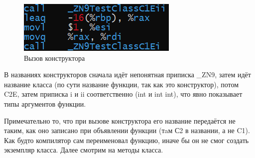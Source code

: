 \documentclass[a4paper,12pt]{article}
\begin{document}
\begin{figure}[H]\label{fig: Названия конструкторов}
\end{figure}
\begin{figure}[H]\label{fig: Вызов конструкторов листинг}
    \centering
    \includegraphics{Вызов конструкторов листинг.png}
    \caption{Вызов конструктора}
\end{figure}

В названиях конструкторов сначала идёт непонятная приписка \_ZN9, затем идёт название класса (по сути название функции, так как это конструктор), потом C2E, затем приписка i и ii соответственно (int и int int), что явно показывает типы аргументов функции.

Примечательно то, что при вызове конструктора его название передаётся не таким, как оно записано при объявлении функции (тaм С2 в названии, а не C1). Как будто компилятор сам переименовал функцию, иначе бы он не смог создать экземпляр класса. Далее смотрим на методы класса.
\end{document}
